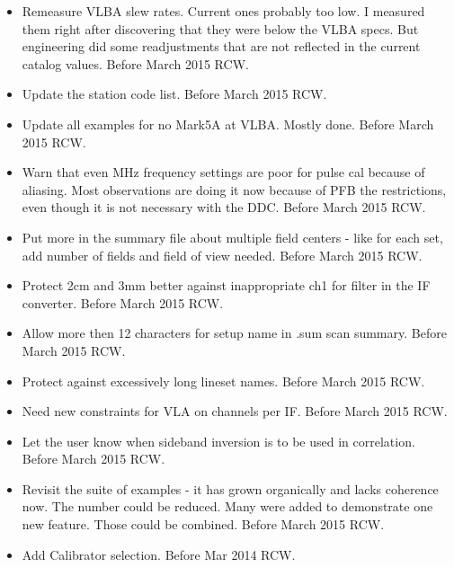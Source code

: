 \documentclass{report}
\begin{document}
\begin{itemize}
\item Remeasure VLBA slew rates.  Current ones probably too low.  I
      measured them right after discovering that they were below the VLBA
      specs.  But engineering did some readjustments that are not 
      reflected in the current catalog values. Before March 2015  RCW.

\item Update the station code list. Before March 2015  RCW.

\item Update all examples for no Mark5A at VLBA. Mostly done. Before 
      March 2015  RCW.

\item Warn that even MHz frequency settings are poor for pulse cal
      because of aliasing.  Most observations are doing it now because 
      of PFB the restrictions, even though it is not necessary with 
      the DDC.  Before March 2015  RCW.

\item Put more in the summary file about multiple field centers - like 
      for each set, add number of fields and field of view needed.
      Before March 2015  RCW.

\item Protect 2cm and 3mm better against inappropriate ch1 for filter
      in the IF converter. Before March 2015  RCW.

\item Allow more then 12 characters for setup name in .sum scan summary.
      Before March 2015  RCW.

\item Protect against excessively long lineset names. Before March 2015  RCW.

\item Need new constraints for VLA on channels per IF. Before March 2015  RCW.

\item Let the user know when sideband inversion is to be used in correlation.
      Before March 2015  RCW.

\item Revisit the suite of examples - it has grown organically and lacks
      coherence now.  The number could be reduced.  Many were added to 
      demonstrate one new feature.  Those could be combined.  Before March 
      2015  RCW.

\item Add Calibrator selection.  Before Mar 2014  RCW.


\end{itemize}
\end{document}
